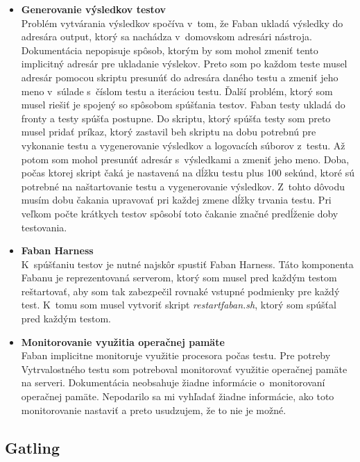 \documentclass[12pt,oneside,final]{fithesis-utf8}
\newcommand\underscore[1]{\underline{\hspace{8pt}}}
\begin{document}
\begin{itemize}

\item \textbf{Generovanie výsledkov testov}\\
Problém vytvárania výsledkov spočíva v~tom, že Faban ukladá výsledky do adresára output, ktorý sa nachádza v~domovskom adresári nástroja. Dokumentácia nepopisuje spôsob, ktorým by som mohol zmeniť tento implicitný adresár pre ukladanie výslekov. Preto som po každom teste musel adresár pomocou skriptu presunúť do adresára daného testu a zmeniť jeho meno v~súlade s~číslom testu a iteráciou testu. Ďalší problém, ktorý som musel riešiť je spojený so spôsobom spúšťania testov. Faban testy ukladá do fronty a testy spúšťa postupne. Do skriptu, ktorý spúšťa testy som preto musel pridať príkaz, ktorý zastavil beh skriptu na dobu potrebnú pre vykonanie testu a vygenerovanie výsledkov a logovacích súborov z~testu. Až potom som mohol presunúť adresár s~výsledkami a zmeniť jeho meno. Doba, počas ktorej skript čaká je nastavená na dĺžku testu plus 100 sekúnd, ktoré sú potrebné na naštartovanie testu a vygenerovanie výsledkov. Z~tohto dôvodu musím dobu čakania upravovať pri každej zmene dĺžky trvania testu. Pri veľkom počte krátkych testov spôsobí toto čakanie značné predĺženie doby testovania.

\item \textbf{Faban Harness}\\
K~spúšťaniu testov je nutné najskôr spustiť Faban Harness. Táto komponenta Fabanu je reprezentovaná serverom, ktorý som musel pred každým testom reštartovať, aby som tak zabezpečil rovnaké vstupné podmienky pre každý test. K~tomu som musel vytvoriť skript \textit{restart\underscore{}faban.sh}, ktorý som spúšťal pred každým testom.\\

\item \textbf{Monitorovanie využitia operačnej pamäte}\\
Faban implicitne monitoruje využitie procesora počas testu. Pre potreby Vytrvalostného testu som potreboval monitorovať využitie operačnej pamäte na serveri. Dokumentácia neobsahuje žiadne informácie o~monitorovaní operačnej pamäte. Nepodarilo sa mi vyhľadať žiadne informácie, ako toto monitorovanie nastaviť a preto usudzujem, že to nie je možné.\\

\end{itemize}

\subsection{Gatling}
\end{document}
